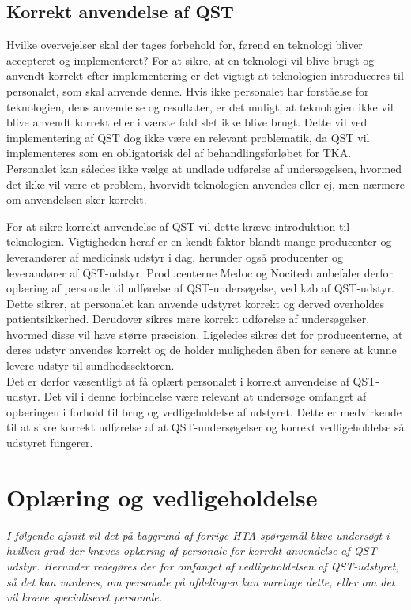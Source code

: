 \subsection{Korrekt anvendelse af QST}
Hvilke overvejelser skal der tages forbehold for, førend en teknologi bliver accepteret og implementeret? %
For at sikre, at en teknologi vil blive brugt og anvendt korrekt efter implementering er det vigtigt at teknologien introduceres til personalet, som skal anvende denne. Hvis ikke personalet har forståelse for teknologien, dens anvendelse og resultater, er det muligt, at teknologien ikke vil blive anvendt korrekt eller i værste fald slet ikke blive brugt. Dette vil ved implementering af QST dog ikke være en relevant problematik, da QST vil implementeres som en obligatorisk del af behandlingsforløbet for TKA. Personalet kan således ikke vælge at undlade udførelse af undersøgelsen, hvormed det ikke vil være et problem, hvorvidt teknologien anvendes eller ej, men nærmere om anvendelsen sker korrekt. 

For at sikre korrekt anvendelse af QST vil dette kræve introduktion til teknologien. Vigtigheden heraf er en kendt faktor blandt mange producenter og leverandører af medicinsk udstyr i dag, herunder også producenter og leverandører af QST-udstyr. Producenterne Medoc og Nocitech anbefaler derfor oplæring af personale til udførelse af QST-undersøgelse, ved køb af QST-udstyr. Dette sikrer, at personalet kan anvende udstyret korrekt og derved overholdes patientsikkerhed. Derudover sikres mere korrekt udførelse af undersøgelser, hvormed disse vil have større præcision. Ligeledes sikres det for producenterne, at deres udstyr anvendes korrekt og de holder muligheden åben for senere at kunne levere udstyr til sundhedssektoren. \\
Det er derfor væsentligt at få oplært personalet i korrekt anvendelse af QST-udstyr. Det vil i denne forbindelse være relevant at undersøge omfanget af oplæringen i forhold til brug og vedligeholdelse af udstyret. Dette er medvirkende til at sikre korrekt udførelse af at QST-undersøgelser og korrekt vedligeholdelse så udstyret fungerer.
\section{Oplæring og vedligeholdelse}
\textit{I følgende afsnit vil det på baggrund af forrige HTA-spørgsmål blive undersøgt i hvilken grad der kræves oplæring af personale for korrekt anvendelse af QST-udstyr. Herunder redegøres der for omfanget af vedligeholdelsen af QST-udstyret, så det kan vurderes, om personale på afdelingen kan varetage dette, eller om det vil kræve specialiseret personale.}


